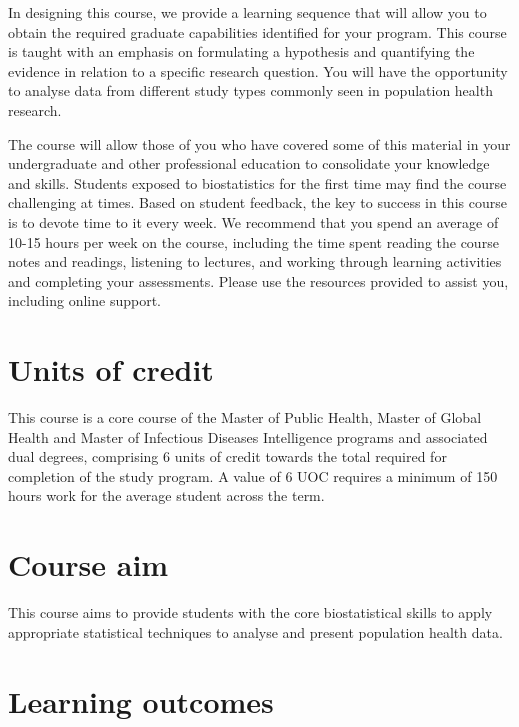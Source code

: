 \documentclass[
  a4paper,
]{memoir}
\begin{document}
In designing this course, we provide a learning sequence that will allow
you to obtain the required graduate capabilities identified for your
program. This course is taught with an emphasis on formulating a
hypothesis and quantifying the evidence in relation to a specific
research question. You will have the opportunity to analyse data from
different study types commonly seen in population health research.

The course will allow those of you who have covered some of this
material in your undergraduate and other professional education to
consolidate your knowledge and skills. Students exposed to biostatistics
for the first time may find the course challenging at times. Based on
student feedback, the key to success in this course is to devote time to
it every week. We recommend that you spend an average of 10-15 hours per
week on the course, including the time spent reading the course notes
and readings, listening to lectures, and working through learning
activities and completing your assessments. Please use the resources
provided to assist you, including online support.

\hypertarget{units-of-credit}{%
\section*{Units of credit}\label{units-of-credit}}


This course is a core course of the Master of Public Health, Master of
Global Health and Master of Infectious Diseases Intelligence programs
and associated dual degrees, comprising 6 units of credit towards the
total required for completion of the study program. A value of 6 UOC
requires a minimum of 150 hours work for the average student across the
term.

\hypertarget{course-aim}{%
\section*{Course aim}\label{course-aim}}


This course aims to provide students with the core biostatistical skills
to apply appropriate statistical techniques to analyse and present
population health data.

\hypertarget{learning-outcomes}{%
\section*{Learning outcomes}\label{learning-outcomes}}
\end{document}
